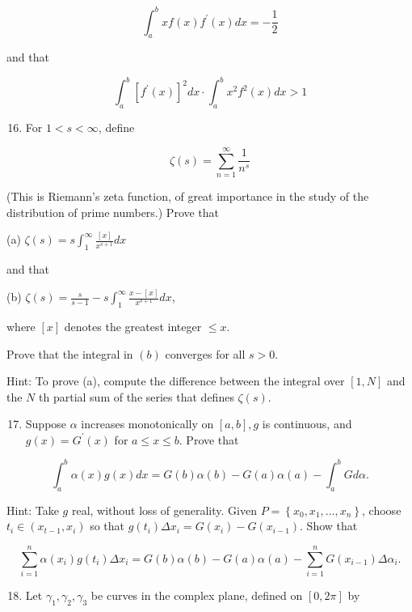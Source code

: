 \documentclass[10pt]{article}
\begin{document}
$$
\int_{a}^{b} x f(x) f^{\prime}(x) d x=-\frac{1}{2}
$$

and that

$$
\int_{a}^{b}\left[f^{\prime}(x)\right]^{2} d x \cdot \int_{a}^{b} x^{2} f^{2}(x) d x>1
$$

\begin{enumerate}
  \setcounter{enumi}{15}
  \item For $1<s<\infty$, define
\end{enumerate}

$$
\zeta(s)=\sum_{n=1}^{\infty} \frac{1}{n^{s}}
$$

(This is Riemann's zeta function, of great importance in the study of the distribution of prime numbers.) Prove that

(a) $\zeta(s)=s \int_{1}^{\infty} \frac{[x]}{x^{s+1}} d x$

and that

(b) $\zeta(s)=\frac{s}{s-1}-s \int_{1}^{\infty} \frac{x-[x]}{x^{s+1}} d x$,

where $[x]$ denotes the greatest integer $\leq x$.

Prove that the integral in $(b)$ converges for all $s>0$.

Hint: To prove (a), compute the difference between the integral over $[1, N]$ and the $N$ th partial sum of the series that defines $\zeta(s)$.

\begin{enumerate}
  \setcounter{enumi}{16}
  \item Suppose $\alpha$ increases monotonically on $[a, b], g$ is continuous, and $g(x)=G^{\prime}(x)$ for $a \leq x \leq b$. Prove that
\end{enumerate}

$$
\int_{a}^{b} \alpha(x) g(x) d x=G(b) \alpha(b)-G(a) \alpha(a)-\int_{a}^{b} G d \alpha .
$$

Hint: Take $g$ real, without loss of generality. Given $P=\left\{x_{0}, x_{1}, \ldots, x_{n}\right\}$, choose $t_{i} \in\left(x_{t-1}, x_{i}\right)$ so that $g\left(t_{i}\right) \Delta x_{i}=G\left(x_{i}\right)-G\left(x_{i-1}\right)$. Show that

$$
\sum_{i=1}^{n} \alpha\left(x_{i}\right) g\left(t_{i}\right) \Delta x_{i}=G(b) \alpha(b)-G(a) \alpha(a)-\sum_{i=1}^{n} G\left(x_{i-1}\right) \Delta \alpha_{i} .
$$

\begin{enumerate}
  \setcounter{enumi}{17}
  \item Let $\gamma_{1}, \gamma_{2}, \gamma_{3}$ be curves in the complex plane, defined on $[0,2 \pi]$ by
\end{enumerate}
\end{document}
